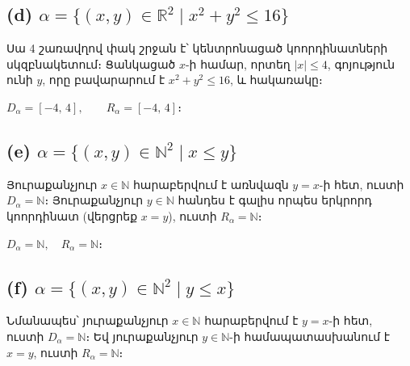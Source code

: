 \documentclass[12pt, a4paper]{article}
\newcommand{\R}{\mathbb{R}}
\newcommand{\N}{\mathbb{N}}
\begin{document}
\subsection*{(d)\; $\alpha = \{(x,y) \in \R^2 \mid x^2 + y^2 \le 16\}$}

Սա 4 շառավղով փակ շրջան է՝ կենտրոնացած կոորդինատների սկզբնակետում։
Ցանկացած $x$-ի համար, որտեղ $|x| \le 4$, գոյություն ունի $y$, որը բավարարում է $x^2 + y^2 \le 16$, և հակառակը։

\begin{answerbox}
$D_\alpha = [-4,\, 4], \qquad R_\alpha = [-4,\, 4]։$
\end{answerbox}

\begin{center}
\end{center}

\subsection*{(e)\; $\alpha = \{(x,y) \in \N^2 \mid x \le y\}$}

Յուրաքանչյուր $x \in \N$ հարաբերվում է առնվազն $y=x$-ի հետ, ուստի $D_\alpha = \N$։
Յուրաքանչյուր $y \in \N$ հանդես է գալիս որպես երկրորդ կոորդինատ (վերցրեք $x=y$), ուստի $R_\alpha = \N$։

\begin{answerbox}
$D_\alpha = \N, \quad R_\alpha = \N։$
\end{answerbox}

\subsection*{(f)\; $\alpha = \{(x,y) \in \N^2 \mid y \le x\}$}

Նմանապես՝ յուրաքանչյուր $x \in \N$ հարաբերվում է $y=x$-ի հետ, ուստի $D_\alpha = \N$։
Եվ յուրաքանչյուր $y \in \N$-ի համապատասխանում է $x=y$, ուստի $R_\alpha = \N$։
\end{document}
